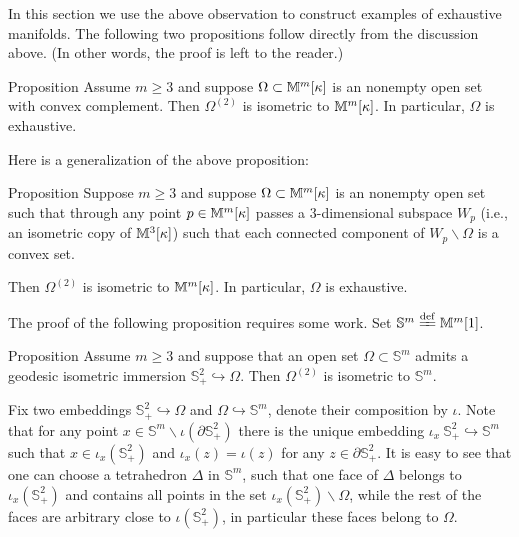 \documentclass[oneside,a4paper]{article}
\begin{document}
In this section we use the above observation to construct examples of exhaustive manifolds.
The following two propositions follow directly from the discussion above.
(In other words, the proof is left to the reader.)

\begin{thm}{Proposition}\label{prop:comp-conv}
Assume $m\ge 3$ and suppose $\Omega\subset\mathbb{M}^m[\kappa]$ is an nonempty open set with convex complement. Then $\Omega^{(2)}$ is isometric to $\mathbb{M}^m[\kappa]$.
In particular, $\Omega$ is exhaustive.
\end{thm}

Here is a generalization of the above proposition:

\begin{thm}{Proposition}\label{prop:comp-conv+}
Suppose $m\ge 3$ and suppose $\Omega\subset\mathbb{M}^m[\kappa]$ is an nonempty open set such that through any point $p\in \mathbb{M}^m[\kappa]$ passes a $3$-dimensional subspace $W_p$ (i.e., an isometric copy of $\mathbb{M}^3[\kappa]$) such that each connected component of $W_p\backslash\Omega$ is a convex set.

Then $\Omega^{(2)}$ is isometric to $\mathbb{M}^m[\kappa]$.
In particular, $\Omega$ is exhaustive.
\end{thm}

The proof of the following proposition requires some work.
Set $\mathbb S^m\df\MM^m[1]$.


\begin{thm}{Proposition}\label{prop:S-m}
Assume $m\ge 3$ and suppose that an open set 
$\Omega\subset\mathbb S^m$
admits a geodesic isometric immersion $\mathbb S^2_+\hookrightarrow \Omega$.
Then $\Omega^{(2)}$ is isometric to $\mathbb S^m$.
\end{thm}

Fix two embeddings $\mathbb S^2_+\hookrightarrow\Omega$ and $\Omega\hookrightarrow\mathbb S^m$,
denote their composition by $\iota$.
Note that for any point $x\in \mathbb S^m\backslash \iota(\partial\mathbb S^2_+)$
there is the unique embedding $\iota_x\:\mathbb S^2_+\hookrightarrow\mathbb S^m$
such that $x\in \iota_x(\mathbb S^2_+)$
and $\iota_x(z)=\iota(z)$ for any $z\in\partial\mathbb S^2_+$.
It is easy to see that one can choose a tetrahedron $\Delta$ in $\mathbb S^m$, such that one face of
$\Delta$ belongs to $\iota_x(\mathbb S^2_+)$ and contains all points in the set  $\iota_x(\mathbb S^2_+)\backslash\Omega$, while the rest of the faces are arbitrary close to $\iota(\mathbb S^2_+)$, in particular these faces belong to $\Omega$.
\end{document}
